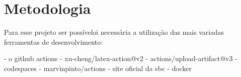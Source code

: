 \section{Metodologia}

Para esse projeto ser possíveloi necessária a utilização das mais variadas ferramentas de desenvolvimento:

- o github actions
- xu-cheng/latex-action@v2
- actions/upload-artifact@v3
- codespaces
- marvinpinto/actions
- site oficial da sbc
- docker
